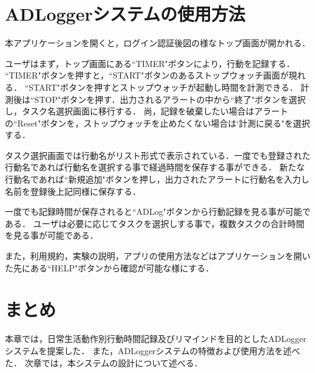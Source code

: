 \section{ADLoggerシステムの使用方法}
本アプリケーションを開くと，ログイン認証後図の様なトップ画面が開かれる．%

ユーザはまず，トップ画面にある``TIMER"ボタンにより，行動を記録する．
``TIMER"ボタンを押すと，``START"ボタンのあるストップウォッチ画面が現れる．
``START"ボタンを押すとストップウォッチが起動し時間を計測できる．
計測後は``STOP"ボタンを押す．出力されるアラートの中から``終了"ボタンを選択し，タスク名選択画面に移行する．
尚，記録を破棄したい場合はアラートの``Reset"ボタンを，ストップウォッチを止めたくない場合は`計測に戻る"を選択する．

タスク選択画面では行動名がリスト形式で表示されている．一度でも登録された行動名であれば行動名を選択する事で経過時間を保存する事ができる．
新たな行動名であれば``新規追加"ボタンを押し，出力されたアラートに行動名を入力し名前を登録後上記同様に保存する．

一度でも記録時間が保存されると``ADLog"ボタンから行動記録を見る事が可能である．
ユーザは必要に応じてタスクを選択しする事で，複数タスクの合計時間を見る事が可能である．

また，利用規約，実験の説明，アプリの使用方法などはアプリケーションを開いた先にある``HELP"ボタンから確認が可能な様にする．

\begin{comment}
記録には，実際に測定する方法と手動で入力する方法の2種類がある．
実際に測定する方法を選択した場合には，ストップウォッチのようにして学習時間を測定する．
測定中の画面を図~\ref{fig:measure4}に示す．

1件でも学習記録が保存されると，図~\ref{fig:outline4}のようにトップ画面に学習記録の概要が表示されるようになる．
ユーザは日ごとや週ごとの学習時間を棒グラフで，学習した教科や内容の割合を円グラフで閲覧することができる．
また，学習を記録した日が色付けされたカレンダーも生成される．

週に一度，動機づけに関するアンケートがユーザに対して実施される．
アンケート回答画面を~\ref{fig:questionnaire4}に示す．
このアンケートによりユーザの動機づけタイプが測定され，その結果に応じてトップ画面に表示される機能が切り替わる．
ポイント機能では学習時間に応じた獲得ポイントが，ランキング機能は他ユーザも合わせた総学習時間のランキングが表示される．
目標設定機能の場合は，はじめにユーザはその週の目標学習時間を設定するよう指示される．
以後は目標に対する達成割合が表示される．
\end{comment}

\section{まとめ}
本章では，日常生活動作別行動時間記録及びリマインドを目的としたADLoggerシステムを提案した．
また，ADLoggerシステムの特徴および使用方法を述べた．
次章では，本システムの設計について述べる．